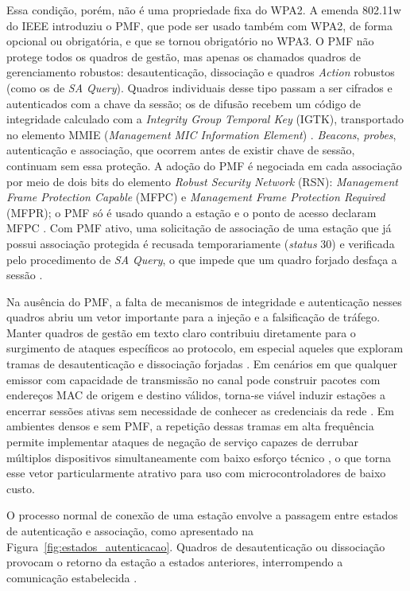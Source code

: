Essa condição, porém, não é uma propriedade fixa do WPA2. A emenda 802.11w do IEEE introduziu o PMF, que pode ser usado também com WPA2, de forma opcional ou obrigatória, e que se tornou obrigatório no WPA3. O PMF não protege todos os quadros de gestão, mas apenas os chamados quadros de gerenciamento robustos: desautenticação, dissociação e quadros \textit{Action} robustos (como os de \textit{SA Query}). Quadros individuais desse tipo passam a ser cifrados e autenticados com a chave da sessão; os de difusão recebem um código de integridade calculado com a \textit{Integrity Group Temporal Key} (IGTK), transportado no elemento MMIE (\textit{Management MIC Information Element}) \cite{CiscoMFP2024}. \textit{Beacons}, \textit{probes}, autenticação e associação, que ocorrem antes de existir chave de sessão, continuam sem essa proteção. A adoção do PMF é negociada em cada associação por meio de dois bits do elemento \textit{Robust Security Network} (RSN): \textit{Management Frame Protection Capable} (MFPC) e \textit{Management Frame Protection Required} (MFPR); o PMF só é usado quando a estação e o ponto de acesso declaram MFPC \cite{CiscoMFP2024}. Com PMF ativo, uma solicitação de associação de uma estação que já possui associação protegida é recusada temporariamente (\textit{status} 30) e verificada pelo procedimento de \textit{SA Query}, o que impede que um quadro forjado desfaça a sessão \cite{CiscoMFP2024}.

Na ausência do PMF, a falta de mecanismos de integridade e autenticação nesses quadros abriu um vetor importante para a injeção e a falsificação de tráfego. Manter quadros de gestão em texto claro contribuiu diretamente para o surgimento de ataques específicos ao protocolo, em especial aqueles que exploram tramas de desautenticação e dissociação forjadas \cite{KohliosHayajneh2018}. Em cenários em que qualquer emissor com capacidade de transmissão no canal pode construir pacotes com endereços MAC de origem e destino válidos, torna‑se viável induzir estações a encerrar sessões ativas sem necessidade de conhecer as credenciais da rede \cite{KohliosHayajneh2018,Lima2025}. Em ambientes densos e sem PMF, a repetição dessas tramas em alta frequência permite implementar ataques de negação de serviço capazes de derrubar múltiplos dispositivos simultaneamente com baixo esforço técnico \cite{Amoordon2022}, o que torna esse vetor particularmente atrativo para uso com microcontroladores de baixo custo.

O processo normal de conexão de uma estação envolve a passagem entre estados de autenticação e associação, como apresentado na Figura~\ref{fig:estados_autenticacao}. Quadros de desautenticação ou dissociação provocam o retorno da estação a estados anteriores, interrompendo a comunicação estabelecida \cite{KristiyantoErnastuti2020}.

